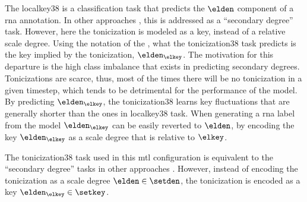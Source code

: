 

The \gls{localkey38} is a classification task that predicts
the $\elden$ component of a \gls{rna} annotation. In other
approaches \parencite{chen2021attend,micchi2021deep}, this
is addressed as a ``secondary degree'' task. However, here
the tonicization is modeled as a key, instead of a relative
scale degree. Using the notation of the
, what
the \gls{tonicization38} task predicts is the key implied by
the tonicization, $\elden_{\elkey}$. The motivation for this
departure is the high class imbalance that exists in
predicting secondary degrees. Tonicizations are scarce,
thus, most of the times there will be no tonicization in a
given timestep, which tends to be detrimental for the
performance of the model. By predicting $\elden_{\elkey}$,
the \gls{tonicization38} learns key fluctuations that are
generally shorter than the ones in \gls{localkey38} task.
When generating a \gls{rna} label from the model
$\elden_{\elkey}$ can be easily reverted to $\elden$, by
encoding the key $\elden_{\elkey}$ as a scale degree that is
relative to $\elkey$. 

The \gls{tonicization38} task used in this \gls{mtl}
configuration is equivalent to the ``secondary degree''
tasks in other approaches
\parencite{chen2021attend,micchi2021deep}. However, instead
of encoding the tonicization as a scale degree $\elden \in
\setden$, the tonicization is encoded as a key
$\elden_\elkey \in \setkey$. 


